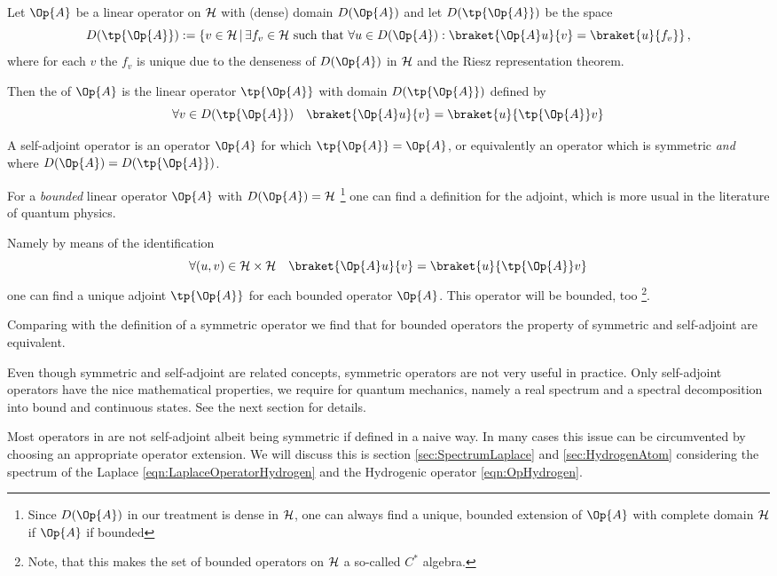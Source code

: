 \begin{defn}
	Let $\Op{A}$ be a linear operator on $\mathcal{H}$ with (dense) domain $D(\Op{A})$
	and let $D(\tp{\Op{A}})$ be the space
	\[ D(\tp{\Op{A}}) := \left\{ v \in \hilbert \, \middle| \,
		\exists f_v \in \hilbert \ \text{such that} \
		\forall u \in D(\Op{A}): \braket{\Op{A} u}{v} = \braket{u}{f_v} \right\},
	\]
	where for each $v$ the $f_v$ is unique due to the denseness
	of $D(\Op{A})$ in $\mathcal{H}$ and the Riesz representation theorem.

	Then the  of $\Op{A}$
	is the linear operator $\tp{\Op{A}}$ with domain $D(\tp{\Op{A}})$
	defined by
	\[ \forall v \in D(\tp{\Op{A}}) \quad \braket{\Op{A} u}{v} = \braket{u}{\tp{\Op{A}} v} \]
\end{defn}

\begin{defn}
	A self-adjoint operator is an operator $\Op{A}$ for which $\tp{\Op{A}} = \Op{A}$,
	or equivalently an operator which is symmetric \emph{and} where
	$D(\Op{A}) = D(\tp{\Op{A}})$.
\end{defn}

\begin{rem}
	For a \emph{bounded} linear operator $\Op{A}$ with $D(\Op{A}) = \hilbert$%
	\footnote{Since $D(\Op{A})$ in our treatment is dense in $\mathcal{H}$,
	one can always find a unique, bounded extension of $\Op{A}$ with complete
	domain $\mathcal{H}$ if $\Op{A}$ if bounded}
	one can find a definition for the adjoint,
	which is more usual in the literature of quantum physics.

	\noindent
	Namely by means of the identification
	\[ \forall (u,v) \in \hilbert \times \hilbert \quad \braket{\Op{A} u}{v} = \braket{u}{\tp{\Op{A}} v} \]
	one can find a unique adjoint $\tp{\Op{A}}$ for each bounded operator $\Op{A}$.
	This operator will be bounded, too%
	\footnote{Note, that this makes the set of bounded operators on $\mathcal{H}$
	a so-called $C^\ast$ algebra.}.

	Comparing with the definition of a symmetric operator we find that for
	bounded operators the property of symmetric and self-adjoint are equivalent.
\end{rem}

\begin{rem}
	Even though symmetric and self-adjoint are related concepts,
	symmetric operators are not very useful in practice.
	Only self-adjoint operators have the nice mathematical properties,
	we require for quantum mechanics, namely a real spectrum
	and a spectral decomposition into bound and continuous states.
	See the next section for details.

	Most operators in \QM are not self-adjoint albeit being symmetric
	if defined in a naive way.
	In many cases this issue can be circumvented
	by choosing an appropriate operator extension.
	We will discuss this 
	is section \vref{sec:SpectrumLaplace} and \vref{sec:HydrogenAtom}
	considering the spectrum of the Laplace \eqref{eqn:LaplaceOperatorHydrogen}
	and the Hydrogenic operator \eqref{eqn:OpHydrogen}.
\end{rem}

